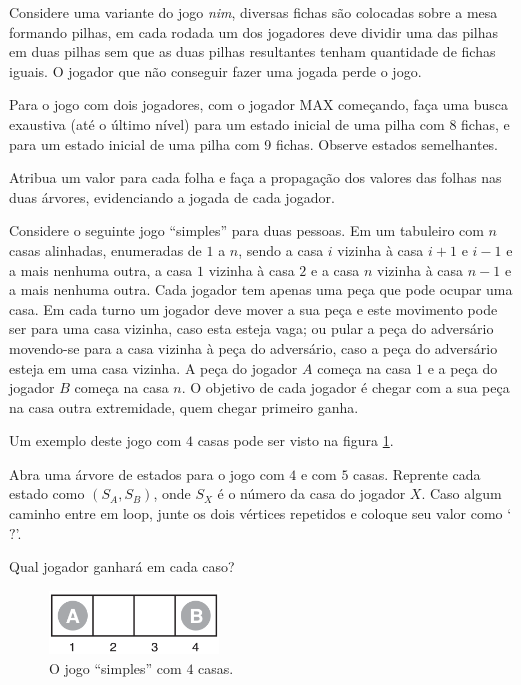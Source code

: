 \documentclass[12pt]{exam}
\begin{document}
\begin{questions}
\item Considere uma variante do jogo \textit{nim}, diversas fichas são colocadas sobre a mesa formando pilhas, em cada rodada um dos jogadores deve dividir uma das pilhas em duas pilhas sem que as duas pilhas resultantes tenham quantidade de fichas iguais. O jogador que não conseguir fazer uma jogada perde o jogo.

Para o jogo com dois jogadores, com o jogador MAX começando, faça uma busca exaustiva (até o último nível) para um estado inicial de uma pilha com 8 fichas, e para um estado inicial de uma pilha com 9 fichas. Observe estados semelhantes.

Atribua um valor para cada folha e faça a propagação dos valores das folhas nas duas árvores, evidenciando a jogada de cada jogador.



\item Considere o seguinte jogo ``simples'' para duas pessoas. Em um tabuleiro com $n$ casas alinhadas, enumeradas de $1$ a $n$, sendo a casa $i$ vizinha à casa $i+1$ e $i-1$ e a mais nenhuma outra, a casa $1$ vizinha à casa $2$ e a casa $n$ vizinha à casa $n-1$ e a mais nenhuma outra. 
Cada jogador tem apenas uma peça que pode ocupar uma casa. 
Em cada turno um jogador deve mover a sua peça e este movimento pode ser para uma casa vizinha, caso esta esteja vaga; ou pular a peça do adversário movendo-se para a casa vizinha à peça do adversário, caso a peça do adversário esteja em uma casa vizinha. A peça do jogador $A$ começa na casa $1$ e a peça do jogador $B$ começa na casa $n$. O objetivo de cada jogador é chegar com a sua peça na casa outra extremidade, quem chegar primeiro ganha.

Um exemplo deste jogo com $4$ casas pode ser visto na figura \ref{fig:simpleGame4}.

Abra uma árvore de estados para o jogo com $4$ e com $5$ casas. Reprente cada estado como $(S_A, S_B)$, onde $S_X$ é o número da casa do jogador $X$. Caso algum caminho entre em loop, junte os dois vértices repetidos e coloque seu valor como `$?$'.

Qual jogador ganhará em cada caso?

\begin{figure}[h]
    \centering
    \includegraphics[width=0.40\textwidth]{simpleGame4}
    \caption{O jogo ``simples'' com $4$ casas.}
    \label{fig:simpleGame4}
\end{figure}




\end{questions}
\end{document}
